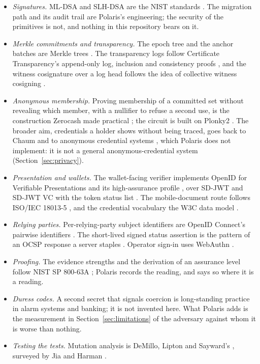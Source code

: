 \begin{itemize}
  \item \emph{Signatures.} ML-DSA and SLH-DSA are the NIST standards \cite{fips204,fips205}. The
    migration path and its audit trail are Polaris's engineering; the security of the primitives is
    not, and nothing in this repository bears on it.
  \item \emph{Merkle commitments and transparency.} The epoch tree and the anchor batches are Merkle
    trees \cite{merkle1988}. The transparency logs follow Certificate Transparency's append-only log,
    inclusion and consistency proofs \cite{rfc6962}, and the witness cosignature over a log head
    follows the idea of collective witness cosigning \cite{syta2016}.
  \item \emph{Anonymous membership.} Proving membership of a committed set without revealing which
    member, with a nullifier to refuse a second use, is the construction Zerocash made practical
    \cite{zerocash2014}; the circuit is built on Plonky2 \cite{plonky2}. The broader aim, credentials
    a holder shows without being traced, goes back to Chaum \cite{chaum1985} and to anonymous
    credential systems \cite{camlys2001}, which Polaris does not implement: it is not a general
    anonymous-credential system (Section~\ref{sec:privacy}).
  \item \emph{Presentation and wallets.} The wallet-facing verifier implements OpenID for Verifiable
    Presentations and its high-assurance profile \cite{oid4vp,haip}, over SD-JWT and SD-JWT VC
    \cite{sdjwt,sdjwtvc} with the token status list \cite{statuslist}. The mobile-document route
    follows ISO/IEC 18013-5 \cite{iso18013}, and the credential vocabulary the W3C data model
    \cite{vcdm2}.
  \item \emph{Relying parties.} Per-relying-party subject identifiers are OpenID Connect's pairwise
    identifiers \cite{oidc}. The short-lived signed status assertion is the pattern of an OCSP
    response a server staples \cite{rfc6960}. Operator sign-in uses WebAuthn \cite{webauthn2}.
  \item \emph{Proofing.} The evidence strengths and the derivation of an assurance level follow NIST
    SP 800-63A \cite{sp80063a}; Polaris records the reading, and says so where it is a reading.
  \item \emph{Duress codes.} A second secret that signals coercion is long-standing practice in
    alarm systems and banking; it is not invented here. What Polaris adds is the measurement in
    Section~\ref{sec:limitations} of the adversary against whom it is worse than nothing.
  \item \emph{Testing the tests.} Mutation analysis is DeMillo, Lipton and Sayward's
    \cite{demillo1978}, surveyed by Jia and Harman \cite{jia2011}.
\end{itemize}

